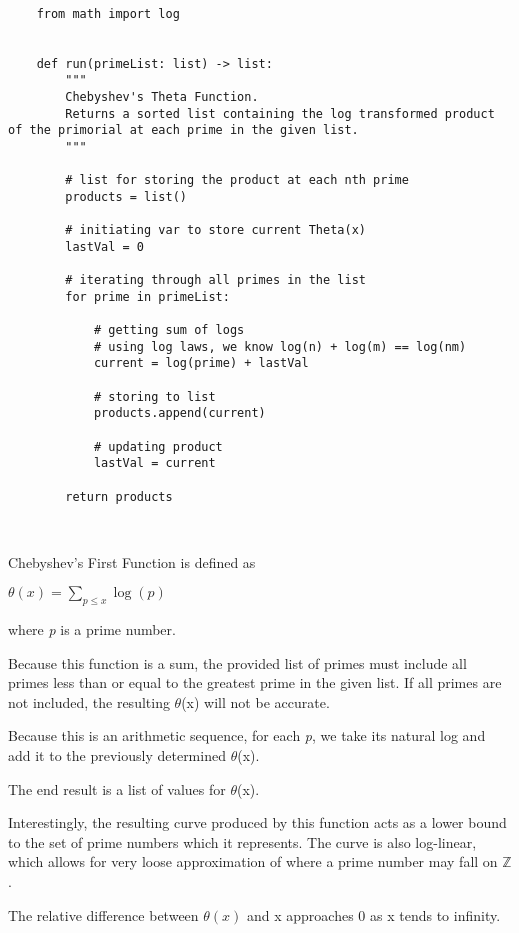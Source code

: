 \documentclass[11pt]{article}
\begin{document}
	
\lstset{style = Theta}

\begin{lstlisting}
	
	from math import log
	
	
	def run(primeList: list) -> list:
		"""
		Chebyshev's Theta Function.
		Returns a sorted list containing the log transformed product of the primorial at each prime in the given list.
		"""
		
		# list for storing the product at each nth prime
		products = list()
		
		# initiating var to store current Theta(x)
		lastVal = 0
		
		# iterating through all primes in the list
		for prime in primeList:
		
			# getting sum of logs
			# using log laws, we know log(n) + log(m) == log(nm)
			current = log(prime) + lastVal
			
			# storing to list
			products.append(current)
			
			# updating product
			lastVal = current
		
		return products
	
		
\end{lstlisting}


Chebyshev's First Function is defined as

$\theta(x) = \sum_{\textit{p} \leq x} \log(\textit{p})$

where \textit{p} is a prime number.

Because this function is a sum, the provided list of primes must include all primes less than or equal to the greatest prime in the given list. If all primes are not included, the resulting $\theta$(x) will not be accurate.

Because this is an arithmetic sequence, for each \textit{p}, we take its natural log and add it to the previously determined $\theta$(x).

The end result is a list of values for $\theta$(x).

Interestingly, the resulting curve produced by this function acts as a lower bound to the set of prime numbers which it represents. The curve is also log-linear, which allows for very loose approximation of where a prime number may fall on $\mathbb{Z}$.

The relative difference between $\theta(x)$ and x approaches 0 as x tends to infinity.
\end{document}
